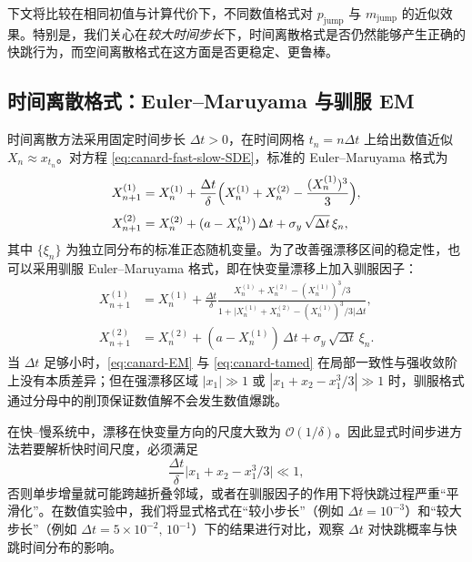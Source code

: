 下文将比较在相同初值与计算代价下，不同数值格式对 \(p_{\mathrm{jump}}\) 与 \(m_{\mathrm{jump}}\) 的近似效果。特别是，我们关心在\emph{较大时间步长}下，时间离散格式是否仍然能够产生正确的快跳行为，而空间离散格式在这方面是否更稳定、更鲁棒。

\subsection{时间离散格式：Euler--Maruyama 与驯服 EM}

时间离散方法采用固定时间步长 \(\Delta t>0\)，在时间网格 \(t_n = n\Delta t\) 上给出数值近似 \(X_n\approx x_{t_n}\)。对方程 \eqref{eq:canard-fast-slow-SDE}，标准的 Euler--Maruyama 格式为
\begin{equation}\label{eq:canard-EM}
	\begin{aligned}
		X^{(1)}_{n+1}
		&= X^{(1)}_n
		+ \frac{\Delta t}{\delta}
		\Bigl(X^{(1)}_n + X^{(2)}_n - \frac{(X^{(1)}_n)^3}{3}\Bigr),\\[3pt]
		X^{(2)}_{n+1}
		&= X^{(2)}_n
		+ (a - X^{(1)}_n)\,\Delta t
		+ \sigma_y\,\sqrt{\Delta t}\,\xi_n,
	\end{aligned}
\end{equation}
其中 \(\{\xi_n\}\) 为独立同分布的标准正态随机变量。为了改善强漂移区间的稳定性，也可以采用驯服 Euler--Maruyama 格式，即在快变量漂移上加入驯服因子：
\begin{equation}\label{eq:canard-tamed}
	\begin{aligned}
		X^{(1)}_{n+1}
		&= X^{(1)}_n
		+ \frac{\Delta t}{\delta}
		\frac{X^{(1)}_n + X^{(2)}_n - (X^{(1)}_n)^3/3}
		{1 + \lvert X^{(1)}_n + X^{(2)}_n - (X^{(1)}_n)^3/3\rvert\Delta t},\\[3pt]
		X^{(2)}_{n+1}
		&= X^{(2)}_n
		+ (a - X^{(1)}_n)\,\Delta t
		+ \sigma_y\,\sqrt{\Delta t}\,\xi_n.
	\end{aligned}
\end{equation}
当 \(\Delta t\) 足够小时，\eqref{eq:canard-EM} 与 \eqref{eq:canard-tamed} 在局部一致性与强收敛阶上没有本质差异；但在强漂移区域 \(|x_1|\gg1\) 或 \(|x_1+x_2 - x_1^3/3|\gg1\) 时，驯服格式通过分母中的削顶保证数值解不会发生数值爆跳。

在快--慢系统中，漂移在快变量方向的尺度大致为 \(\mathcal O(1/\delta)\)。因此显式时间步进方法若要解析快时间尺度，必须满足
\begin{equation}\label{eq:canard-dt-fast}
	\frac{\Delta t}{\delta}\lvert x_1 + x_2 - x_1^3/3\rvert \ll 1,
\end{equation}
否则单步增量就可能跨越折叠邻域，或者在驯服因子的作用下将快跳过程严重“平滑化”。在数值实验中，我们将显式格式在“较小步长”（例如 \(\Delta t=10^{-3}\)）和“较大步长”（例如 \(\Delta t=5\times10^{-2},\,10^{-1}\)）下的结果进行对比，观察 \(\Delta t\) 对快跳概率与快跳时间分布的影响。


